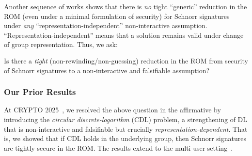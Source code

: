 Another sequence of works \cite{AC:PaiVer05,C:GarBhaLok08,EC:Seurin12,JC:FleJagSch19}  shows that there is \emph{no}  tight ``generic'' reduction in the ROM (even under a minimal formulation of security) for Schnorr signatures under \emph{any} ``representation-independent'' non-interactive assumption. ``Representation-independent'' means that a solution remains valid under change  of group representation. 
Thus, we ask:
 \begin{ques}  %
Is there a \emph{tight} (non-rewinding/non-guessing) reduction in the ROM from security of Schnorr signatures to a non-interactive and falsifiable assumption?
 \end{ques}

 



\subsubsection{Our Prior Results}
At CRYPTO 2025~\cite{C:CFOS25}, we resolved the above question in the affirmative by  introducing the \emph{circular discrete-logarithm} (CDL) problem, a strengthening of DL that is non-interactive and falsifiable but crucially \emph{representation-dependent}. That is, we showed that if CDL holds in the underlying group, then Schnorr signatures are tightly secure in the ROM. The results extend to the multi-user setting~\cite{C:KilMasPan16}.

